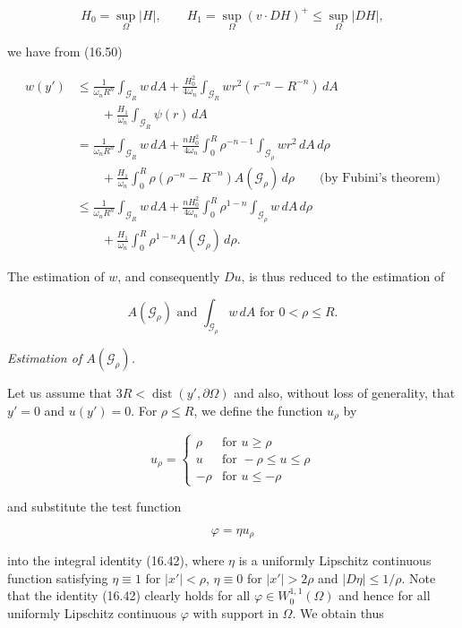 \begin{equation}\tag{16.51}
H_0 = \sup_{\Omega} |H|,\qquad
H_1 = \sup_{\Omega} (v \cdot DH)^+ \leq \sup_{\Omega} |DH|,
\end{equation}

we have from (16.50)

\begin{align*}
w(y') &\leq \frac{1}{\omega_n R^n} \int_{\mathcal{G}_R} w\, dA + \frac{H_0^2}{4\omega_n} \int_{\mathcal{G}_R} w r^2(r^{-n} - R^{-n})\, dA \\
&\qquad + \frac{H_1}{\omega_n} \int_{\mathcal{G}_R} \psi(r)\, dA \\
&= \frac{1}{\omega_n R^n} \int_{\mathcal{G}_R} w\, dA + \frac{n H_0^2}{4\omega_n} \int_0^R \rho^{-n-1} \int_{\mathcal{G}_\rho} w r^2\, dA\, d\rho \\
&\qquad + \frac{H_1}{\omega_n} \int_0^R \rho(\rho^{-n} - R^{-n}) A(\mathcal{G}_\rho)\, d\rho \qquad \text{(by Fubini's theorem)} \tag{16.52}\\
&\leq \frac{1}{\omega_n R^n} \int_{\mathcal{G}_R} w\, dA + \frac{n H_0^2}{4\omega_n} \int_0^R \rho^{1-n} \int_{\mathcal{G}_\rho} w\, dA\, d\rho \\
&\qquad + \frac{H_1}{\omega_n} \int_0^R \rho^{1-n} A(\mathcal{G}_\rho)\, d\rho.
\end{align*}

The estimation of $w$, and consequently $Du$, is thus reduced to the estimation of

\[
A(\mathcal{G}_\rho) \text{ and } \int_{\mathcal{G}_\rho} w\, dA \text{ for } 0 < \rho \leq R.
\]



\textit{Estimation of $A(\mathcal{G}_\rho)$.}

Let us assume that $3R < \operatorname{dist}(y', \partial\Omega)$ and also, without loss of generality, that
$y' = 0$ and $u(y') = 0$. For $\rho \leq R$, we define the function $u_\rho$ by

\[
u_\rho =
\begin{cases}
\rho & \text{for } u \geq \rho \\
u & \text{for } -\rho \leq u \leq \rho \\
-\rho & \text{for } u \leq -\rho
\end{cases}
\]

and substitute the test function

\[
\varphi = \eta u_\rho
\]

into the integral identity (16.42), where $\eta$ is a uniformly Lipschitz continuous function satisfying $\eta \equiv 1$ for $|x'| < \rho$, $\eta \equiv 0$ for $|x'| > 2\rho$ and $|D\eta| \leq 1/\rho$. Note that the identity (16.42) clearly holds for all $\varphi \in W_0^{1,1}(\Omega)$ and hence for all uniformly Lipschitz continuous $\varphi$ with support in $\Omega$. We obtain thus

